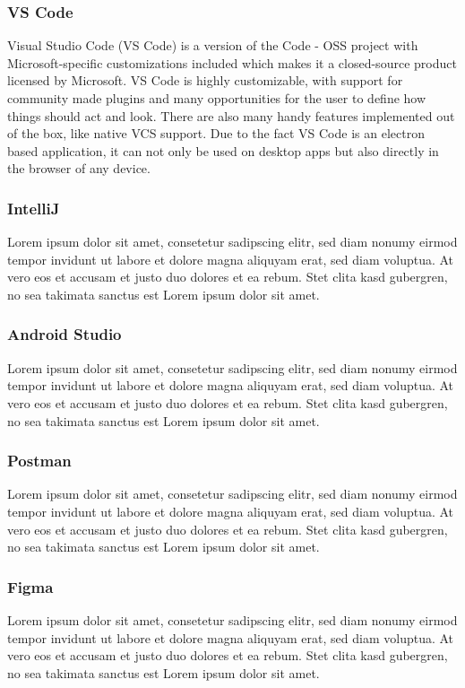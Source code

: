 \Author{\daAuthorTwo}

\subsubsection{VS Code}
Visual Studio Code (VS Code) is a version of the Code - OSS project with Microsoft-specific customizations included which makes it a closed-source product licensed by Microsoft. VS Code is highly customizable, with support for community made plugins and many opportunities for the user to define how things should act and look. \autocite{VSCode:readMe} There are also many handy features implemented out of the box, like native VCS support. Due to the fact VS Code is an electron based application, it can not only be used on desktop apps but also directly in the browser of any device. \autocite{VSCode:electron} \autocite{VSCode:web}

\subsubsection{IntelliJ}
Lorem ipsum dolor sit amet, consetetur sadipscing elitr, sed diam nonumy eirmod tempor invidunt ut labore et dolore magna aliquyam erat, sed diam voluptua. At vero eos et accusam et justo duo dolores et ea rebum. Stet clita kasd gubergren, no sea takimata sanctus est Lorem ipsum dolor sit amet.

\subsubsection{Android Studio}
Lorem ipsum dolor sit amet, consetetur sadipscing elitr, sed diam nonumy eirmod tempor invidunt ut labore et dolore magna aliquyam erat, sed diam voluptua. At vero eos et accusam et justo duo dolores et ea rebum. Stet clita kasd gubergren, no sea takimata sanctus est Lorem ipsum dolor sit amet.

\subsubsection{Postman}
Lorem ipsum dolor sit amet, consetetur sadipscing elitr, sed diam nonumy eirmod tempor invidunt ut labore et dolore magna aliquyam erat, sed diam voluptua. At vero eos et accusam et justo duo dolores et ea rebum. Stet clita kasd gubergren, no sea takimata sanctus est Lorem ipsum dolor sit amet.

\subsubsection{Figma}
Lorem ipsum dolor sit amet, consetetur sadipscing elitr, sed diam nonumy eirmod tempor invidunt ut labore et dolore magna aliquyam erat, sed diam voluptua. At vero eos et accusam et justo duo dolores et ea rebum. Stet clita kasd gubergren, no sea takimata sanctus est Lorem ipsum dolor sit amet.

